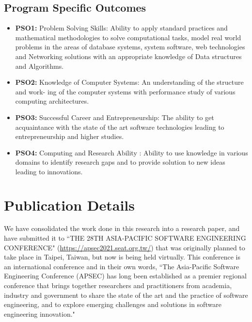 \documentclass[12pt, a4paper]{extarticle}
\begin{document}
    \subsection{Program Specific Outcomes}
    	\begin{itemize}
    		\item[]\textbf{PSO1:} Problem Solving Skills: Ability to apply standard practices and mathematical
    		methodologies to solve computational tasks, model real world problems in the areas of
    		database systems, system software, web technologies and Networking solutions with an
    		appropriate knowledge of Data structures and Algorithms.
    		\item[]\textbf{PSO2:} Knowledge of Computer Systems: An understanding of the structure and work-
    		ing of the computer systems with performance study of various computing architectures.
    		\item[]\textbf{PSO3:} Successful Career and Entrepreneurship: The ability to get acquaintance with
    		the state of the art software technologies leading to entrepreneurship and higher studies.
    		\item[]\textbf{PSO4:} Computing and Research Ability : Ability to use knowledge in various domains
    		to identify research gaps and to provide solution to new ideas leading to innovations.
    	\end{itemize}
    \newpage
    \section{Publication Details}
    \paragraph{} We have consolidated the work done in this research into a research paper, and have submitted it to ``THE 28TH ASIA-PACIFIC SOFTWARE ENGINEERING CONFERENCE" (\url{https://apsec2021.seat.org.tw/}) that was originally planned to take place in Taipei, Taiwan, but now is being held virtually. This conference is an international conference and in their own words, ``The Asia-Pacific Software Engineering Conference (APSEC) has long been established as a premier regional conference that brings together researchers and practitioners from academia, industry and government to share the state of the art and the practice of software engineering, and to explore emerging challenges and solutions in software engineering innovation."
\end{document}
